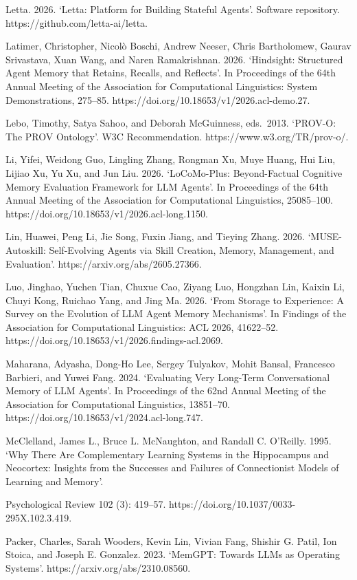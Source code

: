 \documentclass[
  english,
  a4paper,
  DIV=11,
  numbers=noendperiod]{scrreprt}
\begin{document}
Letta. 2026. `Letta: Platform for Building Stateful Agents'. Software
repository. https://github.com/letta-ai/letta.

Latimer, Christopher, Nicolò Boschi, Andrew Neeser, Chris Bartholomew,
Gaurav Srivastava, Xuan Wang, and Naren Ramakrishnan. 2026. `Hindsight:
Structured Agent Memory that Retains, Recalls, and Reflects'. In
Proceedings of the 64th Annual Meeting of the Association for
Computational Linguistics: System Demonstrations, 275--85.
https://doi.org/10.18653/v1/2026.acl-demo.27.

Lebo, Timothy, Satya Sahoo, and Deborah McGuinness, eds.~2013. `PROV-O:
The PROV Ontology'. W3C Recommendation. https://www.w3.org/TR/prov-o/.

Li, Yifei, Weidong Guo, Lingling Zhang, Rongman Xu, Muye Huang, Hui Liu,
Lijiao Xu, Yu Xu, and Jun Liu. 2026. `LoCoMo-Plus: Beyond-Factual
Cognitive Memory Evaluation Framework for LLM Agents'. In Proceedings of
the 64th Annual Meeting of the Association for Computational
Linguistics, 25085--100. https://doi.org/10.18653/v1/2026.acl-long.1150.

Lin, Huawei, Peng Li, Jie Song, Fuxin Jiang, and Tieying Zhang. 2026.
`MUSE-Autoskill: Self-Evolving Agents via Skill Creation, Memory,
Management, and Evaluation'. https://arxiv.org/abs/2605.27366.

Luo, Jinghao, Yuchen Tian, Chuxue Cao, Ziyang Luo, Hongzhan Lin, Kaixin
Li, Chuyi Kong, Ruichao Yang, and Jing Ma. 2026. `From Storage to
Experience: A Survey on the Evolution of LLM Agent Memory Mechanisms'.
In Findings of the Association for Computational Linguistics: ACL 2026,
41622--52. https://doi.org/10.18653/v1/2026.findings-acl.2069.

Maharana, Adyasha, Dong-Ho Lee, Sergey Tulyakov, Mohit Bansal, Francesco
Barbieri, and Yuwei Fang. 2024. `Evaluating Very Long-Term
Conversational Memory of LLM Agents'. In Proceedings of the 62nd Annual
Meeting of the Association for Computational Linguistics, 13851--70.
https://doi.org/10.18653/v1/2024.acl-long.747.

McClelland, James L., Bruce L. McNaughton, and Randall C. O'Reilly.
1995. `Why There Are Complementary Learning Systems in the Hippocampus
and Neocortex: Insights from the Successes and Failures of Connectionist
Models of Learning and Memory'.

Psychological Review 102 (3): 419--57.
https://doi.org/10.1037/0033-295X.102.3.419.

Packer, Charles, Sarah Wooders, Kevin Lin, Vivian Fang, Shishir G.
Patil, Ion Stoica, and Joseph E. Gonzalez. 2023. `MemGPT: Towards LLMs
as Operating Systems'. https://arxiv.org/abs/2310.08560.
\end{document}
